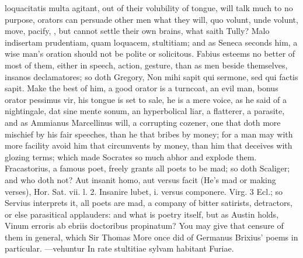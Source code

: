 {loquacitatis multa agitant, out of their volubility of tongue, will
talk much to no purpose, orators can persuade other men what they will,
quo volunt, unde volunt, move, pacify, \etc{}, but cannot settle their own
brains, what saith Tully? Malo indisertam prudentiam, quam loquacem,
stultitiam; and as Seneca seconds him, a wise man's oration should
not be polite or solicitous. Fabius esteems no better of most of
them, either in speech, action, gesture, than as men beside themselves,
insanos declamatores; so doth Gregory, Non mihi sapit qui sermone, sed
qui factis sapit. Make the best of him, a good orator is a turncoat, an
evil man, bonus orator pessimus vir, his tongue is set to sale, he is a
mere voice, as he said of a nightingale, dat sine mente sonum, an
hyperbolical liar, a flatterer, a parasite, and as  Ammianus
Marcellinus will, a corrupting cozener, one that doth more mischief by
his fair speeches, than he that bribes by money; for a man may with
more facility avoid him that circumvents by money, than him that
deceives with glozing terms; which made Socrates so much abhor and
explode them. Fracastorius, a famous poet, freely grants all poets
to be mad; so doth Scaliger; and who doth not? Aut insanit homo,
aut versus facit (He's mad or making verses), Hor. Sat. vii. l. 2.
Insanire lubet, i. versus componere. Virg. 3 Ecl.; so Servius
interprets it, all poets are mad, a company of bitter satirists,
detractors, or else parasitical applauders: and what is poetry itself,
but as Austin holds, Vinum erroris ab ebriis doctoribus propinatum? You
may give that censure of them in general, which Sir Thomas More once
did of Germanus Brixius' poems in particular.
---vehuntur
In rate stultitiae sylvam habitant Furiae.

}
